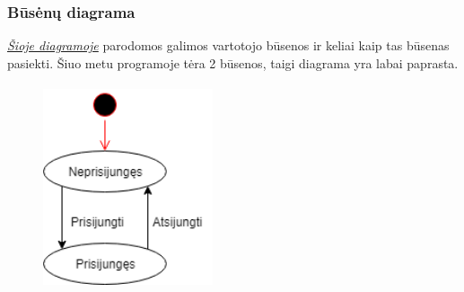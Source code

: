 \documentclass[oneside]{VUMIFPSkursinis}
\begin{document}
\subsubsection{Būsėnų diagrama}
 \hyperref[fig:Busenu]{\textit{Šioje diagramoje}} parodomos galimos vartotojo būsenos ir keliai kaip tas būsenas pasiekti. Šiuo metu programoje tėra 2 būsenos, taigi diagrama yra labai paprasta.
	\begin{figure}[H]
	\centering	
	\includegraphics[width=5cm,height=6cm,keepaspectratio]{Busenu.png}
	\caption{}
	\label{fig:Busenu}
\end{figure}
\pagebreak
\end{document}
